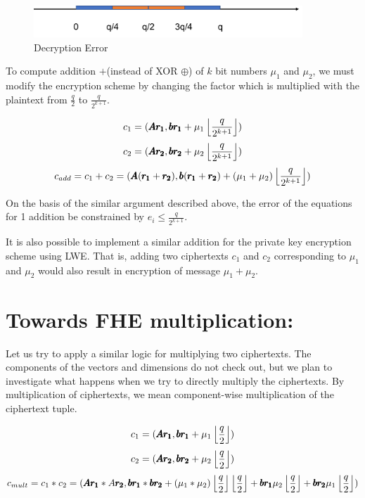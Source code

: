 \documentclass[usletter]{article}
\begin{document}
\begin{figure}[!htbp]
\begin{center}
\includegraphics[width=0.9\textwidth]{error.pdf}
\end{center}
\caption{Decryption Error}
\label{error}
\end{figure}

\begin{corollary}
To compute addition $ + $(instead of XOR $\oplus$) of $k$ bit numbers $\mu_1$ and $\mu_2$, we must modify the encryption scheme by changing the factor which is multiplied with the plaintext from $\frac{q}{2}$ to $\frac{q}{2^{k+1}}$.

$$c_1 = ( \pmb{Ar_1}, \pmb{br_1} + \mu_1\left\lfloor \frac{q}{2^{k+1}} \right\rfloor )$$
$$c_2 = ( \pmb{Ar_2}, \pmb{br_2} + \mu_2\left\lfloor \frac{q}{2^{k+1}} \right\rfloor )$$
$$c_{add} = c_1 + c_2 = ( \pmb{A}(\pmb{r_1} + \pmb{r_2}), \pmb{b}(\pmb{r_1} +\pmb{r_2}) + (\mu_1 + \mu_2)\left\lfloor \frac{q}{2^{k+1}} \right\rfloor )$$

On the basis of the similar argument described above, the error of the equations for 1 addition be 
constrained by $e_i \leq \frac{q}{2^{k+1}}$.
\end{corollary}
\begin{remark}
It is also possible to implement a similar addition for the private key encryption  scheme 
using LWE. That is, adding two ciphertexts $c_1$ and $c_2$ corresponding to $\mu_1$ and $\mu_2$
would also result in encryption of message $\mu_1 + \mu_2$.
\end{remark}

\section{Towards FHE multiplication:}
Let us try to apply a similar logic for multiplying two ciphertexts. The components of the vectors and dimensions do not check out, but we plan to investigate what happens when we try to directly multiply the ciphertexts. By multiplication of ciphertexts, we mean component-wise multiplication of the ciphertext tuple. 

$$c_1 = ( \pmb{Ar_1}, \pmb{br_1} + \mu_1\left\lfloor \frac{q}{2} \right\rfloor )$$
$$c_2 = ( \pmb{Ar_2}, \pmb{br_2} + \mu_2\left\lfloor \frac{q}{2} \right\rfloor )$$
$$c_{mult} = c_1 * c_2 = ( \pmb{A}\pmb{r_1} * A \pmb{r_2}, \pmb{b}\pmb{r_1} *\pmb{b}\pmb{r_2} + (\mu_1 * \mu_2)\left\lfloor \frac{q}{2} \right\rfloor\left\lfloor \frac{q}{2} \right\rfloor + \pmb{br_1}\mu_2\left\lfloor \frac{q}{2} \right\rfloor + \pmb{br_2}\mu_1\left\lfloor \frac{q}{2} \right\rfloor )$$
\end{document}
